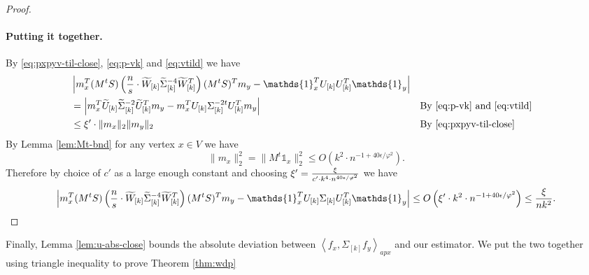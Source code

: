 \documentclass[letterpaper,11pt]{article}
\theoremstyle{plain}
\theoremstyle{definition}
\theoremstyle{remark}
\newcommand{\e}{\epsilon}
\newcommand{\adp}[1]
  {\ensuremath{\left\langle #1 \right\rangle_{\scriptscriptstyle apx}}}
\newcommand{\mycolor}[1]{\textcolor{black}{#1}}
\begin{document}
\begin{proof}
\paragraph{Putting it together.} By \eqref{eq:pxpyv-til-close}, \eqref{eq:p-vk} and \eqref{eq:vtild} we have
\begin{align}
&\left|m_x^T  (M^tS)\left(\frac{n}{s}\cdot\widetilde{W}_{[k]} \widetilde{\Sigma}^{-4}_{[k]} \widetilde{W}^T_{[k]}\right) (M^tS)^T m_y - \mathds{1}_x^T U_{[k]}{U}_{[k]}^T  \mathds{1}_y \right| \nonumber \\
&= \left| m_x^T\widetilde{U}_{[k]} \widetilde{\Sigma}_{[k]}^{-2} \widetilde{U}_{[k]}^T m_y - m_x^T U_{[k]} {\Sigma}_{[k]}^{-2t} U_{[k]}^Tm_y\right| && \text{By \eqref{eq:p-vk} and \eqref{eq:vtild}}\nonumber \\
& \leq  \xi' \cdot\|m_x\|_2\|m_y\|_2 && \text{By \eqref{eq:pxpyv-til-close}} 
\end{align}
By Lemma \ref{lem:Mt-bnd} for any vertex $x\in V$ we have 
\begin{equation}
\|m_x\|^2_2=\|M^{t}\mathds{1}_{x}\|^2_2 \leq O\left(k^2 \cdot n^{-1+40\epsilon /\varphi^2}\right)  \text{.}
\end{equation}
Therefore by choice of $c'$ as a large enough constant and choosing $\xi' = \frac{\xi}{c'\cdot \mycolor{k^4} \cdot n^{40 \e/\varphi^2}}$ we have
\begin{equation}
\label{eq:e2-done}
\left|m_x^T  (M^tS)\left(\frac{n}{s}\cdot\widetilde{W}_{[k]} \widetilde{\Sigma}^{-4}_{[k]} \widetilde{W}^T_{[k]}\right) (M^tS)^T m_y - \mathds{1}_x^T U_{[k]}\Sigma_{[k]}{U}_{[k]}^T  \mathds{1}_y \right|\leq O\left(\xi'\cdot k^2 \cdot n^{-1+40\epsilon /\varphi^2}\right) \leq  \frac{\xi}{\mycolor{nk^2}} \text{.}
\end{equation}
\end{proof}


Finally, Lemma \ref{lem:u-abs-close} bounds the absolute deviation between $\adp{f_x, \Sigma_{[k]} f_y}$
and our estimator. We put the two together using triangle inequality to prove Theorem 
\ref{thm:wdp} 
\end{document}
